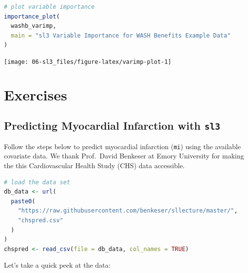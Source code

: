 \documentclass[12pt, krantz2,]{krantz}
\newcommand{\passthrough}[1]{#1}
\theoremstyle{definition}
\theoremstyle{definition}
\theoremstyle{definition}
\newcommand{\1}{\mathbbm{1}}
\begin{document}
\begin{lstlisting}[language=R]
# plot variable importance
importance_plot(
  washb_varimp,
  main = "sl3 Variable Importance for WASH Benefits Example Data"
)
\end{lstlisting}

\begin{center}\texttt{[image: 06-sl3\_files/figure-latex/varimp-plot-1]} \end{center}

\hypertarget{sl3-exercises}{%
\section{Exercises}\label{sl3-exercises}}

\hypertarget{sl3ex1}{%
\subsection{\texorpdfstring{Predicting Myocardial Infarction with \texttt{sl3}}{Predicting Myocardial Infarction with sl3}}\label{sl3ex1}}

Follow the steps below to predict myocardial infarction (\passthrough{\lstinline!mi!}) using the
available covariate data. We thank Prof.~David Benkeser at Emory University for
making the this Cardiovascular Health Study (CHS) data accessible.

\begin{lstlisting}[language=R]
# load the data set
db_data <- url(
  paste0(
    "https://raw.githubusercontent.com/benkeser/sllecture/master/",
    "chspred.csv"
  )
)
chspred <- read_csv(file = db_data, col_names = TRUE)
\end{lstlisting}

Let's take a quick peek at the data:
\end{document}
